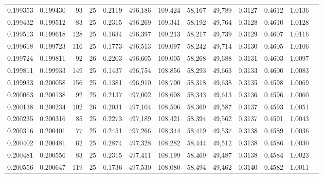 \begin{tabular}{rrrrrrrrrrrrr}
0.199353 & 0.199430 &    93 &  25 &                                     0.2119 & 496,186 & 109,424 &  58,167 &  49,789 & 0.3127 & 0.4612 & 1.0136 \\
0.199432 & 0.199512 &    83 &  25 &                                     0.2315 & 496,269 & 109,341 &  58,192 &  49,764 & 0.3128 & 0.4610 & 1.0128 \\
0.199513 & 0.199618 &   128 &  25 &                                     0.1634 & 496,397 & 109,213 &  58,217 &  49,739 & 0.3129 & 0.4607 & 1.0116 \\
0.199618 & 0.199723 &   116 &  25 &                                     0.1773 & 496,513 & 109,097 &  58,242 &  49,714 & 0.3130 & 0.4605 & 1.0106 \\
0.199724 & 0.199811 &    92 &  26 &                                     0.2203 & 496,605 & 109,005 &  58,268 &  49,688 & 0.3131 & 0.4603 & 1.0097 \\
0.199811 & 0.199933 &   149 &  25 &                                     0.1437 & 496,754 & 108,856 &  58,293 &  49,663 & 0.3133 & 0.4600 & 1.0083 \\
0.199933 & 0.200058 &   156 &  25 &                                     0.1381 & 496,910 & 108,700 &  58,318 &  49,638 & 0.3135 & 0.4598 & 1.0069 \\
0.200063 & 0.200138 &    92 &  25 &                                     0.2137 & 497,002 & 108,608 &  58,343 &  49,613 & 0.3136 & 0.4596 & 1.0060 \\
0.200138 & 0.200234 &   102 &  26 &                                     0.2031 & 497,104 & 108,506 &  58,369 &  49,587 & 0.3137 & 0.4593 & 1.0051 \\
0.200235 & 0.200316 &    85 &  25 &                                     0.2273 & 497,189 & 108,421 &  58,394 &  49,562 & 0.3137 & 0.4591 & 1.0043 \\
0.200316 & 0.200401 &    77 &  25 &                                     0.2451 & 497,266 & 108,344 &  58,419 &  49,537 & 0.3138 & 0.4589 & 1.0036 \\
0.200402 & 0.200481 &    62 &  25 &                                     0.2874 & 497,328 & 108,282 &  58,444 &  49,512 & 0.3138 & 0.4586 & 1.0030 \\
0.200481 & 0.200556 &    83 &  25 &                                     0.2315 & 497,411 & 108,199 &  58,469 &  49,487 & 0.3138 & 0.4584 & 1.0023 \\
0.200556 & 0.200647 &   119 &  25 &                                     0.1736 & 497,530 & 108,080 &  58,494 &  49,462 & 0.3140 & 0.4582 & 1.0011 \\

\end{tabular}
